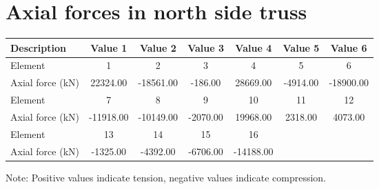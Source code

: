\documentclass[
  letterpaper,
  DIV=11,
  numbers=noendperiod]{scrartcl}
\def\arraystretch{1.4}
\begin{document}
\newpage{}

\section{}\label{section-25}

\section{}\label{section-26}

\section{}\label{section-27}

\section{}\label{section-28}

\section{}\label{section-29}

\section{}\label{section-30}

\section{}\label{section-31}

\section{Axial forces in north side
truss}\label{axial-forces-in-north-side-truss}

\normalfont
\renewcommand{\arraystretch}{1.2}
\setlength{\tabcolsep}{11pt}
\begin{tabular}{|l|c|c|c|c|c|c|}
\hline
Description & Value 1 & Value 2 & Value 3 & Value 4 & Value 5 & Value 6 \\
\hline
Element & 1 & 2 & 3 & 4 & 5 & 6 \\
Axial force (kN) & 22324.00 & -18561.00 & -186.00 & 28669.00 & -4914.00 & -18900.00 \\
\hline
Element & 7 & 8 & 9 & 10 & 11 & 12 \\
Axial force (kN) & -11918.00 & -10149.00 & -2070.00 & 19968.00 & 2318.00 & 4073.00 \\
\hline
Element & 13 & 14 & 15 & 16 &  &  \\
Axial force (kN) & -1325.00 & -4392.00 & -6706.00 & -14188.00 &  &  \\
\hline
\end{tabular}

Note: Positive values indicate tension, negative values indicate
compression.
\end{document}

